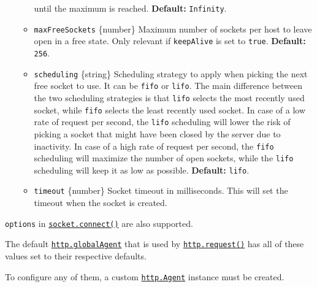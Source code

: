 \begin{itemize}
\begin{itemize}
    until the maximum is reached. \textbf{Default:} \texttt{Infinity}.
  \item
    \texttt{maxFreeSockets} \{number\} Maximum number of sockets per
    host to leave open in a free state. Only relevant if
    \texttt{keepAlive} is set to \texttt{true}. \textbf{Default:}
    \texttt{256}.
  \item
    \texttt{scheduling} \{string\} Scheduling strategy to apply when
    picking the next free socket to use. It can be
    \texttt{\textquotesingle{}fifo\textquotesingle{}} or
    \texttt{\textquotesingle{}lifo\textquotesingle{}}. The main
    difference between the two scheduling strategies is that
    \texttt{\textquotesingle{}lifo\textquotesingle{}} selects the most
    recently used socket, while
    \texttt{\textquotesingle{}fifo\textquotesingle{}} selects the least
    recently used socket. In case of a low rate of request per second,
    the \texttt{\textquotesingle{}lifo\textquotesingle{}} scheduling
    will lower the risk of picking a socket that might have been closed
    by the server due to inactivity. In case of a high rate of request
    per second, the \texttt{\textquotesingle{}fifo\textquotesingle{}}
    scheduling will maximize the number of open sockets, while the
    \texttt{\textquotesingle{}lifo\textquotesingle{}} scheduling will
    keep it as low as possible. \textbf{Default:}
    \texttt{\textquotesingle{}lifo\textquotesingle{}}.
  \item
    \texttt{timeout} \{number\} Socket timeout in milliseconds. This
    will set the timeout when the socket is created.
  \end{itemize}
\end{itemize}

\texttt{options} in
\href{net.md\#socketconnectoptions-connectlistener}{\texttt{socket.connect()}}
are also supported.

The default \hyperref[httpglobalagent]{\texttt{http.globalAgent}} that
is used by
\hyperref[httprequestoptions-callback]{\texttt{http.request()}} has all
of these values set to their respective defaults.

To configure any of them, a custom
\hyperref[class-httpagent]{\texttt{http.Agent}} instance must be
created.

\begin{Shaded}
\begin{Highlighting}[]
\OperatorTok{,} \OperatorTok{;}
\OperatorTok{=}  \NormalTok{(\{ }\OperatorTok{:} \NormalTok{ \})}\OperatorTok{;}
 \OperatorTok{=}\OperatorTok{;}
\OperatorTok{,}\OperatorTok{;}
\end{Highlighting}
\end{Shaded}

